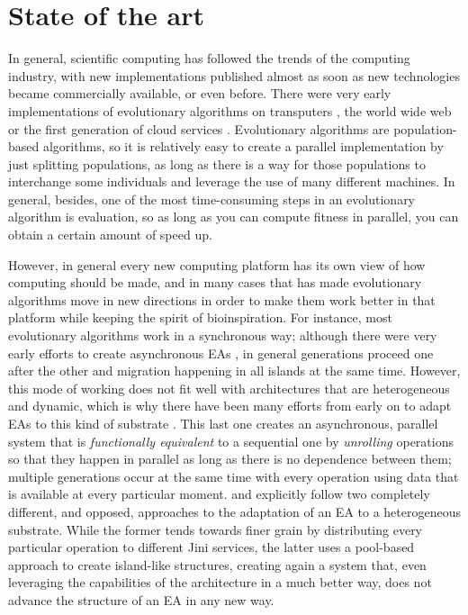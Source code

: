 \documentclass[sigconf]{acmart}
\begin{document}
\section{State of the art}

In general, scientific computing has followed the trends of the
computing industry, with new implementations published almost as soon
as new technologies became commercially available, or even
before. There were very early implementations of evolutionary
algorithms on transputers \cite{voigt1990modelling}, the world wide
web \cite{chong:1999:jDGPi} or the first generation of cloud
services
\cite{DBLP:journals/corr/abs-1105-6205,de2017parallel,salza2017ccube}. Evolutionary
algorithms are population-based algorithms, so it is relatively easy
to create a parallel implementation by just splitting populations, as
long as there is a way for those populations to interchange some
individuals and leverage the use of many different machines. In
general, besides, one of the most time-consuming steps in an
evolutionary algorithm is evaluation, so as long as you can compute
fitness in parallel, you can obtain a certain amount of speed up.

However, in general every new computing platform has its own view of
how computing should be made, and in many cases that has made
evolutionary algorithms move in new directions in order to make them
work better in that platform while keeping the spirit of
bioinspiration. For instance, most evolutionary algorithms work in a
synchronous way; although there were very early efforts to create
asynchronous EAs \cite{coleman89}, in general
generations proceed one after the other and migration happening in
all islands at the same time. However, this mode of working does not
fit well with architectures that are heterogeneous and dynamic, which
is why there have been many efforts from early
on to adapt EAs to this kind of substrate
\cite{Jini:FEA2000,zorman2002creation,baugh2003asynchronous}. This
last one creates an asynchronous, parallel system that is {\em functionally
  equivalent} to a sequential one by {\em unrolling} operations so
that they happen in parallel as long as there is no dependence between
them; multiple generations occur at the same time with every operation
using data that is available at every particular
moment. \cite{Jini:FEA2000} and \cite{zorman2002creation} explicitly
follow two completely different, and opposed, approaches to the
adaptation of an EA to a heterogeneous substrate. While the former
tends towards finer grain by distributing every particular operation
to different Jini services, the latter uses a pool-based approach to
create island-like structures, creating again a system that, even
leveraging the capabilities of the architecture in a much better way,
does not advance the  structure of an EA in any new way.
\end{document}
